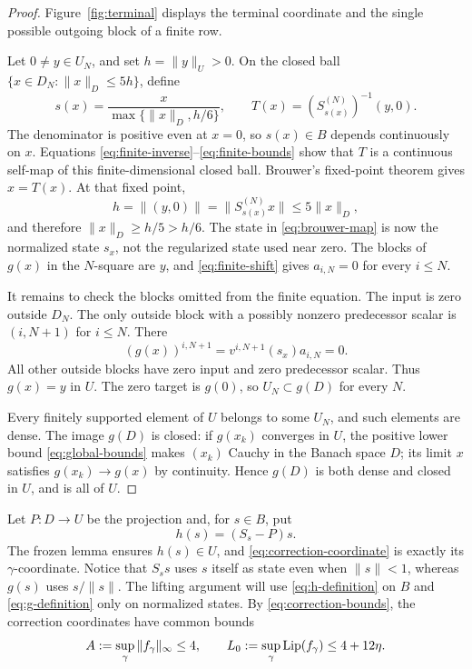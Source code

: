 \begin{proof}
Figure~\ref{fig:terminal} displays the terminal coordinate and the
single possible outgoing block of a finite row.


Let \(0\ne y\in U_N\), and set \(h=\|y\|_U>0\). On the closed ball
\(\{x\in D_N:\|x\|_D\leq5h\}\), define
\begin{equation}
 s(x)=\frac{x}{\max\{\|x\|_D,h/6\}},\qquad
 T(x)=(S_{s(x)}^{(N)})^{-1}(y,0).                            \label{eq:brouwer-map}
\end{equation}
The denominator is positive even at \(x=0\), so \(s(x)\in B\)
depends continuously on \(x\). Equations \eqref{eq:finite-inverse}--\eqref{eq:finite-bounds} show that \(T\)
is a continuous self-map of this finite-dimensional closed ball.
Brouwer's fixed-point theorem gives \(x=T(x)\). At that fixed point,
\[
       h=\|(y,0)\|=\|S_{s(x)}^{(N)}x\|\leq5\|x\|_D,
\]
and therefore \(\|x\|_D\geq h/5>h/6\). The state in \eqref{eq:brouwer-map} is now
the normalized state \(s_x\), not the regularized state used near zero.
The blocks of \(g(x)\) in the \(N\)-square are \(y\), and \eqref{eq:finite-shift} gives
\(a_{i,N}=0\) for every \(i\leq N\).

It remains to check the blocks omitted from the finite equation.
The input is zero outside \(D_N\). The only outside block with a
possibly nonzero predecessor scalar is \((i,N+1)\) for \(i\leq N\).
There
\[
 (g(x))^{i,N+1}
       =v^{i,N+1}(s_x)a_{i,N}=0.
\]
All other outside blocks have zero input and zero predecessor scalar.
Thus \(g(x)=y\) in \(U\). The zero target is \(g(0)\), so
\(U_N\subset g(D)\) for every \(N\).

Every finitely supported element of \(U\) belongs to some \(U_N\),
and such elements are dense. The image \(g(D)\) is closed: if
\(g(x_k)\) converges in \(U\), the positive lower bound \eqref{eq:global-bounds} makes
\((x_k)\) Cauchy in the Banach space \(D\); its limit \(x\) satisfies
\(g(x_k)\to g(x)\) by continuity. Hence \(g(D)\) is both dense and
closed in \(U\), and is all of \(U\).
\end{proof}

Let \(P:D\to U\) be the projection and, for \(s\in B\), put
\begin{equation}
                         h(s)=(S_s-P)s.                      \label{eq:h-definition}
\end{equation}
The frozen lemma ensures \(h(s)\in U\), and \eqref{eq:correction-coordinate} is exactly its
\(\gamma\)-coordinate. Notice that \(S_s s\) uses \(s\) itself
as state even when \(\|s\|<1\), whereas \(g(s)\) uses \(s/\|s\|\).
The lifting argument will use \eqref{eq:h-definition} on \(B\) and \eqref{eq:g-definition} only on
normalized states. By \eqref{eq:correction-bounds}, the correction coordinates have common
bounds
\begin{equation}
 A:=\sup_\gamma\|f_\gamma\|_\infty\leq4,\qquad
 L_0:=\sup_\gamma\operatorname{Lip}(f_\gamma)\leq4+12\eta.                  \label{eq:base-bounds}
\end{equation}
